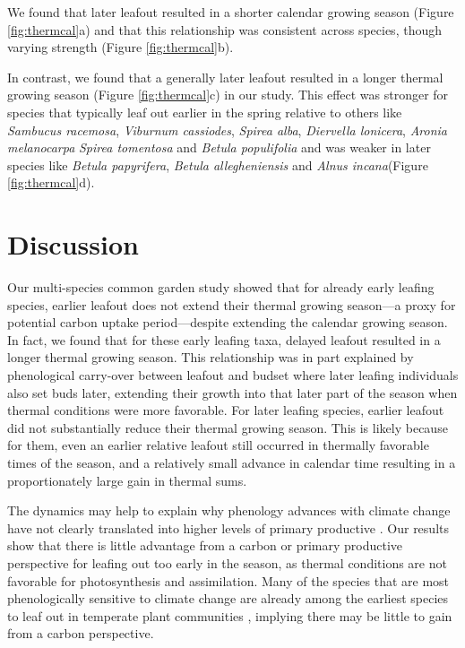 \documentclass[12 pt]{article}
\begin{document}
We found that later leafout resulted in a shorter calendar growing season (Figure \ref{fig:thermcal}a) and that this relationship was consistent across species, though varying strength  (Figure \ref{fig:thermcal}b).

In contrast, we found that a generally later leafout resulted in a longer thermal growing season (Figure \ref{fig:thermcal}c) in our study. This effect was stronger for species that typically leaf out earlier in the spring relative to others like \emph{Sambucus racemosa}, \emph{Viburnum cassiodes}, \emph{Spirea alba}, \emph{Diervella lonicera}, \emph{Aronia melanocarpa} \emph{Spirea tomentosa} and \emph{Betula populifolia} and was weaker in later species like \emph{Betula papyrifera}, \emph{Betula allegheniensis} and \emph{Alnus incana}(Figure \ref{fig:thermcal}d).


\section{Discussion}
Our multi-species common garden study showed that for already early leafing species, earlier leafout does not extend their thermal growing season---a proxy for potential carbon uptake period---despite extending the calendar growing season. In fact, we found that for these early leafing taxa, delayed leafout resulted in a longer thermal growing season. This relationship was in part explained by phenological carry-over between leafout and budset where later leafing individuals also set buds later, extending their growth into that later part of the season when thermal conditions were more favorable.  For later leafing species, earlier leafout did not substantially reduce their thermal growing season. This is likely because for them, even an earlier relative leafout still occurred in thermally favorable times of the season, and a relatively small advance in calendar time resulting in a proportionately large gain in thermal sums.

The dynamics may help to explain why phenology advances with climate change have not clearly translated into higher levels of primary productive \citep{}. Our results show that there is little advantage from a carbon or primary productive perspective for leafing out too early in the season, as thermal conditions are not favorable for photosynthesis and assimilation. Many of the species that are most phenologically sensitive to climate change are already among the earliest species to leaf out in temperate plant communities \citep{}, implying there may be little to gain from a carbon perspective.
\end{document}
